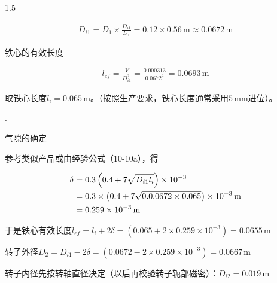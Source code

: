 \documentclass[a4paper,11pt]{ctexart}
\newcommand{\m}{\,\text{m}}
\newcommand{\mm}{\,\text{mm}}
\newenvironment{shrinkeq}[2]
{
	\bgroup
	\addtolength\abovedisplayshortskip{#1}
	\addtolength\abovedisplayskip{#1}
	\addtolength\belowdisplayshortskip{#2}
	\addtolength\belowdisplayskip{#2}
}
{
	\egroup
	\ignorespacesafterend
}
\newcounter{designitem}
\newcommand{\entry}
{
	\vspace{0.5em}
	\par
	\stepcounter{designitem}
	\thedesignitem.
}
\begin{document}
\begin{spacing}{1.5}
\begin{shrinkeq}{-1.5ex}{-1.5ex}
\begin{align}
	D_{i1} = D_1\times\frac{D_{i1}}{D_1} = 0.12\times 0.56\m  \approx 0.0672\m
	\end{align}
\end{shrinkeq}
\par
铁心的有效长度
\begin{shrinkeq}{-1.5ex}{-1ex}
	\begin{align}
	l_{ef} = \frac{V}{D_{i1}^{2}} = \frac{0.000313}{0.0672^2} = 0.0693\m
	\end{align}
\end{shrinkeq}
取铁心长度$l_{i}=0.065\m$。（按照生产要求，铁心长度通常采用$5\mm$进位）。
\entry
气隙的确定
\par
参考类似产品或由经验公式（10-10a），得
\begin{shrinkeq}{-1.5ex}{-1.5ex}
	\begin{align}
	\delta &= 0.3\left(0.4+7\sqrt{D_{i1}l_i}\right)\times 10^{-3} \\
	&=0.3\times\left(0.4+7\sqrt{0.0.0672\times 0.065}\right)\times 10^{-3}\m \notag\\
	&= 0.259\times 10^{-3} \m\notag
	\end{align}
\end{shrinkeq}
\par
于是铁心有效长度$l_{ef}=l_i+2\delta = \left(0.065+2\times 0.259\times 10^{-3}\right) = 0.0655\m$
\par
转子外径$D_2 = D_{i1}-2\delta = \left(0.0672-2\times 0.259\times 10^{-3}\right) = 0.0667\m$
\par
转子内径先按转轴直径决定（以后再校验转子轭部磁密）：$D_{i2} = 0.019\m$


\end{spacing}
\end{document}
